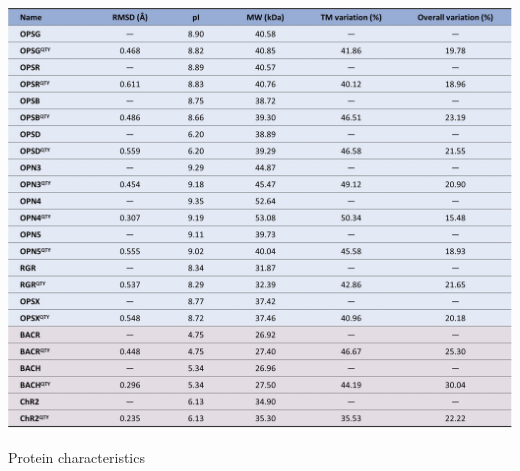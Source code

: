 \documentclass[fleqn,10pt,lineno]{manuscript}
\begin{document}


\begin{table}[h]
	\centering
	\includegraphics[width=\linewidth]{figures/characteristics.jpg}
	\caption{Protein characteristics}
	\label{tb:characteristics}
\end{table}
\end{document}
